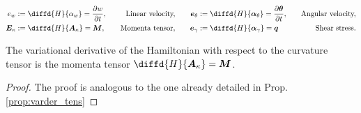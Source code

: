 \begin{equation}\label{eq:e_Min}
\begin{aligned}
e_w &:= \diffd{H}{\alpha_w} = \diffp{w}{t},  \quad &\text{Linear velocity,} \\
\bm{E}_{\kappa} &:= \diffd{H}{\bm{A}_{\kappa}} = \bm{M}, \quad &\text{Momenta tensor,}\\
\end{aligned} \qquad
\begin{aligned}
\bm{e}_{\theta} &:= \diffd{H}{\bm\alpha_{\theta}} = \diffp{\bm{\theta}}{t}, \quad &\text{Angular velocity,}  \\
\bm{e}_{\gamma} &:= \diffd{H}{\bm\alpha_{\gamma}} = \bm{q} \quad &\text{Shear stress.} \\
\end{aligned}
\end{equation}
\begin{proposition}
	The variational derivative of the Hamiltonian with respect to the curvature tensor is the momenta tensor $\diffd{H}{\bm{A}_{\kappa}} = \bm{M}$.
	\begin{proof}
		The proof is analogous to the one already detailed in Prop. \ref{prop:varder_tens}
	\end{proof}
\end{proposition}

